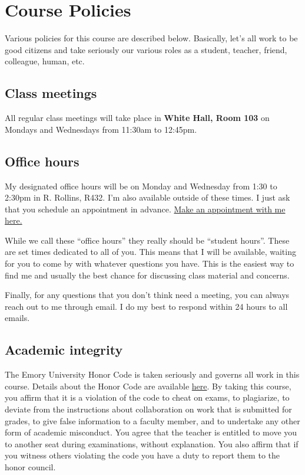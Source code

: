 \documentclass[11pt,]{article}
\begin{document}
\hypertarget{course-policies}{%
\section{Course Policies}\label{course-policies}}

Various policies for this course are described below. Basically, let's
all work to be good citizens and take seriously our various roles as a
student, teacher, friend, colleague, human, etc.

\hypertarget{class-meetings}{%
\subsection{Class meetings}\label{class-meetings}}

All regular class meetings will take place in \textbf{White Hall, Room
103} on Mondays and Wednesdays from 11:30am to 12:45pm.

\hypertarget{office-hours}{%
\subsection{Office hours}\label{office-hours}}

My designated office hours will be on Monday and Wednesday from 1:30 to
2:30pm in R. Rollins, R432. I'm also available outside of these times. I
just ask that you schedule an appointment in advance.
\href{https://mccarthy-meetings.youcanbook.me/}{Make an appointment with
me here.}

While we call these ``office hours'' they really should be ``student
hours''. These are set times dedicated to all of you. This means that I
will be available, waiting for you to come by with whatever questions
you have. This is the easiest way to find me and usually the best chance
for discussing class material and concerns.

Finally, for any questions that you don't think need a meeting, you can
always reach out to me through email. I do my best to respond within 24
hours to all emails.

\hypertarget{academic-integrity}{%
\subsection{Academic integrity}\label{academic-integrity}}

The Emory University Honor Code is taken seriously and governs all work
in this course. Details about the Honor Code are available
\href{http://catalog.college.emory.edu/academic/policies-regulations/honor-code.html}{here}.
By taking this course, you affirm that it is a violation of the code to
cheat on exams, to plagiarize, to deviate from the instructions about
collaboration on work that is submitted for grades, to give false
information to a faculty member, and to undertake any other form of
academic misconduct. You agree that the teacher is entitled to move you
to another seat during examinations, without explanation. You also
affirm that if you witness others violating the code you have a duty to
report them to the honor council.
\end{document}

